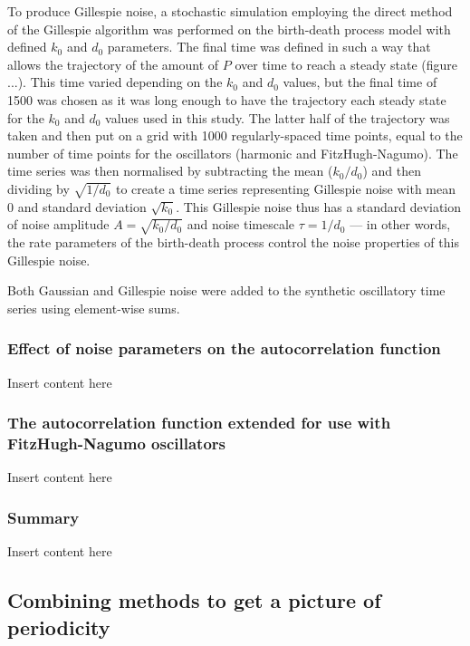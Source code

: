 To produce Gillespie noise, a stochastic simulation employing the direct method of the Gillespie algorithm was performed on the birth-death process model with defined $k_{0}$ and $d_{0}$ parameters.
The final time was defined in such a way that allows the trajectory of the amount of $P$ over time to reach a steady state (figure ...).
This time varied depending on the $k_{0}$ and $d_{0}$ values, but the final time of \num{1500} was chosen as it was long enough to have the trajectory each steady state for the $k_{0}$ and $d_{0}$ values used in this study.
The latter half of the trajectory was taken and then put on a grid with \num{1000} regularly-spaced time points, equal to the number of time points for the oscillators (harmonic and FitzHugh-Nagumo).
The time series was then normalised by subtracting the mean ($k_{0}/d_{0}$) and then dividing by $\sqrt{1/d_{0}}$ to create a time series representing Gillespie noise with mean 0 and standard deviation $\sqrt{k_{0}}$.
This Gillespie noise thus has a standard deviation of noise amplitude $A = \sqrt{k_{0}/d_{0}}$ and noise timescale $\tau = 1/d_{0}$ --- in other words, the rate parameters of the birth-death process control the noise properties of this Gillespie noise.

Both Gaussian and Gillespie noise were added to the synthetic oscillatory time series using element-wise sums.

\subsubsection{Effect of noise parameters on the autocorrelation function}
\label{subsubsec:analysis-characterisation-acf-sinusoid}

Insert content here

\subsubsection{The autocorrelation function extended for use with FitzHugh-Nagumo oscillators}
\label{subsubsec:analysis-characterisation-acf-fhn}

Insert content here

\subsubsection{Summary}
\label{subsubsec:analysis-characterisation-acf-summary}

Insert content here

\subsection{Combining methods to get a picture of periodicity}
\label{subsec:analysis-characterisation-combined}

